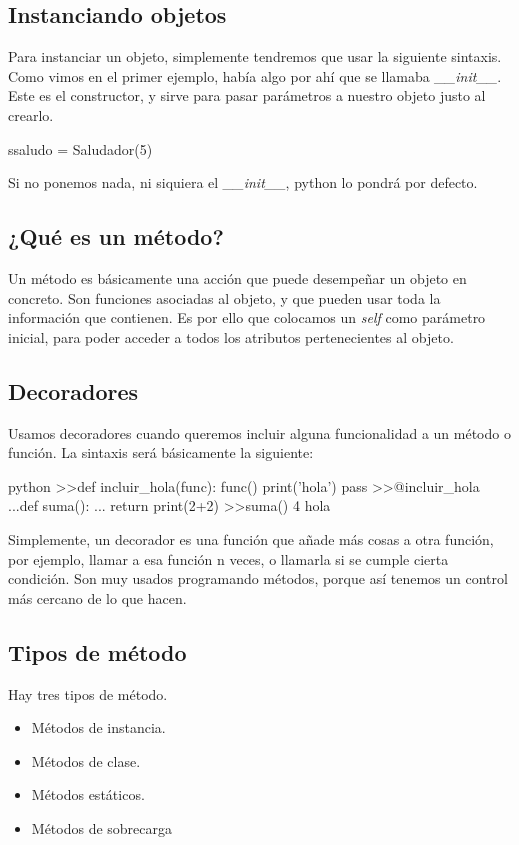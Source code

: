 \documentclass{article}
\begin{document}
\subsection{Instanciando objetos}
Para instanciar un objeto, simplemente tendremos que usar la siguiente sintaxis. Como vimos en el primer ejemplo, había algo por ahí que se llamaba \textit{\_\_init\_\_}. Este es el constructor, y sirve para pasar parámetros a nuestro objeto justo al crearlo.
\begin{mintedbox}
ssaludo = Saludador(5)
\end{mintedbox}
Si no ponemos nada, ni siquiera el \textit{\_\_init\_\_}, python lo pondrá por defecto.

\subsection{¿Qué es un método?}
Un método es básicamente una acción que puede desempeñar un objeto en concreto. Son funciones asociadas al objeto, y que pueden usar toda la información que contienen. Es por ello que colocamos un \textit{self} como parámetro inicial, para poder acceder a todos los atributos pertenecientes al objeto.

\subsection{Decoradores}
Usamos decoradores cuando queremos incluir alguna funcionalidad a un método o función. La sintaxis será básicamente la siguiente:
\begin{mintedbox}{python}
>>def incluir_hola(func):
    func()
    print('hola')
    pass
>>@incluir_hola
...def suma():
... return  print(2+2)
>>suma()
4
hola
\end{mintedbox}

Simplemente, un decorador es una función que añade más cosas a otra función, por ejemplo, llamar a esa función n veces, o llamarla si se cumple cierta condición. Son muy usados programando métodos, porque así tenemos un control más cercano de lo que hacen.
\subsection{Tipos de método}
Hay tres tipos de método.

\begin{itemize}
    \item Métodos de instancia.
    \item Métodos de clase.
     \item Métodos estáticos.
     \item Métodos de sobrecarga
\end{itemize}
\end{document}
